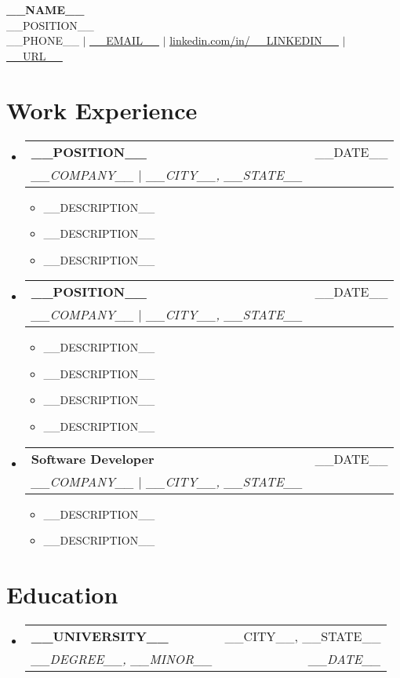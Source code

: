 \documentclass[letterpaper,11pt]{article}
\makeatletter
\newcommand{\resumeItem}[1]{
  \item\small{
    {#1 \vspace{-2pt}}
  }
}
\newcommand{\resumeSubheading}[4]{
  \vspace{-2pt}\item
    \begin{tabular*}{0.97\textwidth}[t]{l@{\extracolsep{\fill}}r}
      \textbf{#1} & #2 \\
      \textit{\small#3} & \textit{\small #4} \\
    \end{tabular*}\vspace{-7pt}
}
\newcommand{\resumeSubSubheading}[2]{
    \item
    \begin{tabular*}{0.97\textwidth}{l@{\extracolsep{\fill}}r}
      \textit{\small#1} & \textit{\small #2} \\
    \end{tabular*}\vspace{-7pt}
}
\newcommand{\resumeSubHeadingListStart}{\begin{itemize}[leftmargin=0.15in, label={}]}
\newcommand{\resumeSubHeadingListEnd}{\end{itemize}}
\newcommand{\resumeItemListStart}{\begin{itemize}}
\newcommand{\resumeItemListEnd}{\end{itemize}\vspace{-5pt}}
\makeatother
\begin{document}
\begin{center}
    \textbf{\Huge \scshape __NAME__} \\ \vspace{1pt}
    {\large \mdseries __POSITION__} \\ \vspace{1px}
    \small __PHONE__ $|$ \href{mailto:__EMAIL__}{\underline{__EMAIL__}} $|$ 
    \href{https://www.linkedin.com/in/__LINKEDIN__/}{\underline{linkedin.com/in/__LINKEDIN__}} $|$
    \href{__URL__}{\underline{__URL__}}
\end{center}


\section{Work Experience}
  \resumeSubHeadingListStart

    \resumeSubheading
      {__POSITION__}{__DATE__}
      {__COMPANY__ $|$ __CITY__, __STATE__}{}
      \resumeItemListStart
        \resumeItem{__DESCRIPTION__}
        \resumeItem{__DESCRIPTION__}
        \resumeItem{__DESCRIPTION__}
      \resumeItemListEnd
      

    \resumeSubheading
      {__POSITION__}{__DATE__}
      {__COMPANY__ $|$ __CITY__, __STATE__}{}
      \resumeItemListStart
        \resumeItem{__DESCRIPTION__}
        \resumeItem{__DESCRIPTION__}
        \resumeItem{__DESCRIPTION__}
        \resumeItem{__DESCRIPTION__}
    \resumeItemListEnd

    \resumeSubheading
      {Software Developer}{__DATE__}
      {__COMPANY__ $|$ __CITY__, __STATE__}{}
      \resumeItemListStart
        \resumeItem{__DESCRIPTION__}
        \resumeItem{__DESCRIPTION__}
      \resumeItemListEnd

  \resumeSubHeadingListEnd

\section{Education}
  \resumeSubHeadingListStart
    \resumeSubheading
      {__UNIVERSITY__}{__CITY__, __STATE__}
      {__DEGREE__, __MINOR__}{__DATE__}
  \resumeSubHeadingListEnd
\end{document}
